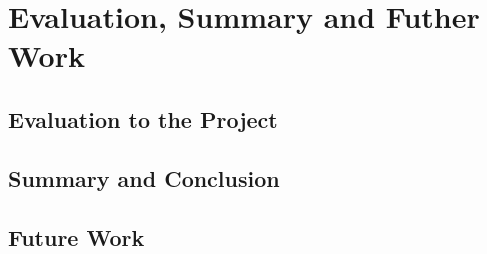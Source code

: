 \chapter{Evaluation, Summary and Futher Work}

\section{Evaluation to the Project}

\section{Summary and Conclusion}

\section{Future Work}
